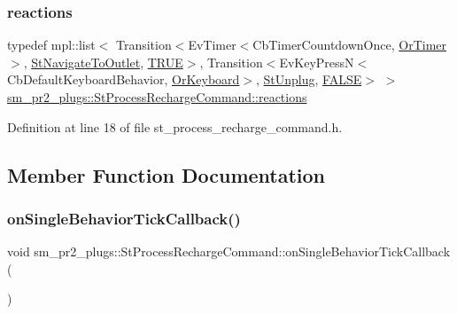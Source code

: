 \subsubsection{\texorpdfstring{reactions}{reactions}}
{\footnotesize\ttfamily typedef mpl\+::list$<$ Transition$<$Ev\+Timer$<$Cb\+Timer\+Countdown\+Once, \hyperlink{classsm__pr2__plugs_1_1OrTimer}{Or\+Timer}$>$, \hyperlink{structsm__pr2__plugs_1_1StNavigateToOutlet}{St\+Navigate\+To\+Outlet}, \hyperlink{structsm__pr2__plugs_1_1StProcessRechargeCommand_1_1TRUE}{T\+R\+UE}$>$, Transition$<$Ev\+Key\+PressN$<$Cb\+Default\+Keyboard\+Behavior, \hyperlink{classsm__pr2__plugs_1_1OrKeyboard}{Or\+Keyboard}$>$, \hyperlink{structsm__pr2__plugs_1_1StUnplug}{St\+Unplug}, \hyperlink{structsm__pr2__plugs_1_1StProcessRechargeCommand_1_1FALSE}{F\+A\+L\+SE}$>$ $>$ \hyperlink{structsm__pr2__plugs_1_1StProcessRechargeCommand_a97c8363f0989dc9dabc36a20445ba569}{sm\+\_\+pr2\+\_\+plugs\+::\+St\+Process\+Recharge\+Command\+::reactions}}



Definition at line 18 of file st\+\_\+process\+\_\+recharge\+\_\+command.\+h.



\subsection{Member Function Documentation}
\mbox{\label{structsm__pr2__plugs_1_1StProcessRechargeCommand_acc2a9e8dbb67f236e16eafb4db51c3c5}} 
\subsubsection{\texorpdfstring{on\+Single\+Behavior\+Tick\+Callback()}{onSingleBehaviorTickCallback()}}
{\footnotesize\ttfamily void sm\+\_\+pr2\+\_\+plugs\+::\+St\+Process\+Recharge\+Command\+::on\+Single\+Behavior\+Tick\+Callback (\begin{DoxyParamCaption}{ }\end{DoxyParamCaption})\hspace{0.3cm}{\ttfamily [inline]}}



